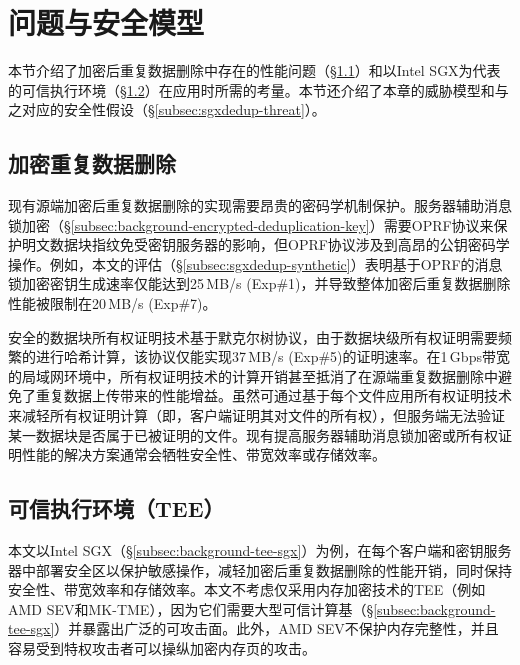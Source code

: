 \section{问题与安全模型}
\label{sec:sgxdedup-background}

本节介绍了加密后重复数据删除中存在的性能问题（\S\ref{subsec:sgxdedup-problem}）和以Intel SGX为代表的可信执行环境（\S\ref{subsec:sgxdedup-sgx}）在应用时所需的考量。本节还介绍了本章的威胁模型和与之对应的安全性假设（\S\ref{subsec:sgxdedup-threat}）。

\subsection{加密重复数据删除}
\label{subsec:sgxdedup-problem}

现有源端加密后重复数据删除的实现需要昂贵的密码学机制保护。服务器辅助消息锁加密（\S\ref{subsec:background-encrypted-deduplication-key}）需要OPRF协议\cite{naor2004Number}来保护明文数据块指纹免受密钥服务器的影响，但OPRF协议涉及到高昂的公钥密码学操作。例如，本文的评估（\S\ref{subsec:sgxdedup-synthetic}）表明基于OPRF的消息锁加密密钥生成速率仅能达到25\,MB/s (Exp\#1)，并导致整体加密后重复数据删除性能被限制在20\,MB/s (Exp\#7)。

安全的数据块所有权证明技术基于默克尔树协议，由于数据块级所有权证明需要频繁的进行哈希计算，该协议仅能实现37\,MB/s (Exp\#5)的证明速率。在1\,Gbps带宽的局域网环境中，所有权证明技术的计算开销甚至抵消了在源端重复数据删除中避免了重复数据上传带来的性能增益。虽然可通过基于每个文件应用所有权证明技术来减轻所有权证明计算（即，客户端证明其对文件的所有权），但服务端无法验证某一数据块是否属于已被证明的文件。现有提高服务器辅助消息锁加密或所有权证明性能的解决方案通常会牺牲安全性\cite{li2020TED,xu2013weak,pietro12}、带宽效率\cite{harnik2010side,li15}或存储效率\cite{zhou2015secdep,qin17,li2020TED}。


\subsection{可信执行环境（TEE）}
\label{subsec:sgxdedup-sgx} 

本文以Intel SGX\cite{sgx}（\S\ref{subsec:background-tee-sgx}）为例，在每个客户端和密钥服务器中部署安全区以保护敏感操作，减轻加密后重复数据删除的性能开销，同时保持安全性、带宽效率和存储效率。本文不考虑仅采用内存加密技术的TEE（例如AMD SEV\cite{AMDSEV}和MK-TME\cite{MK-TME}），因为它们需要大型可信计算基（\S\ref{subsec:background-tee-sgx}）并暴露出广泛的可攻击面\cite{mofrad18}。此外，AMD SEV\cite{AMDSEV}不保护内存完整性，并且容易受到特权攻击者可以操纵加密内存页\cite{mofrad18}的攻击。


